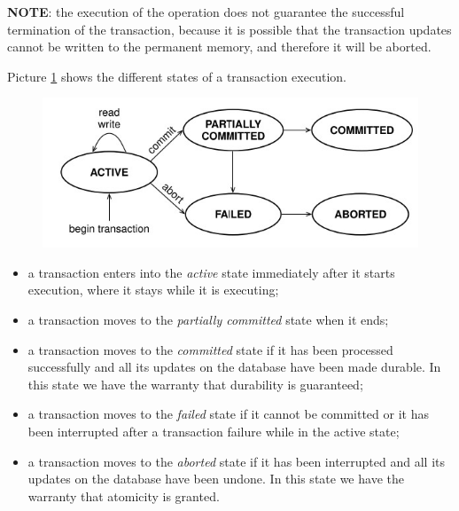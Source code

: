 \textbf{NOTE}: the execution of the \textit{} operation does not guarantee the successful termination of the transaction, because it is possible that the transaction updates cannot be written to the permanent memory, and therefore it will be aborted.

Picture \ref{tr2} shows the different states of a transaction execution.

\begin{figure}[h!]
		\centering
		\includegraphics[scale = 1.3]{img/tr2.jpg}
		\label{tr2}
\end{figure}

\begin{itemize}

    \item a transaction enters into the \textit{active} state immediately after it starts execution, where it stays while it is executing;
    
    \item a transaction moves to the \textit{partially committed} state when it ends;
    
    \item a transaction moves to the \textit{committed} state if it has been processed successfully and all its updates on the database have been made durable. In this state we have the warranty that durability is guaranteed;    
    
    \item a transaction moves to the \textit{failed} state if it cannot be committed or it has been interrupted after a transaction failure while in the active state;
    
    \item a transaction moves to the \textit{aborted} state if it has been interrupted and all its updates on the database have been undone. In this state we have the warranty that atomicity is granted.
    
\end{itemize}


